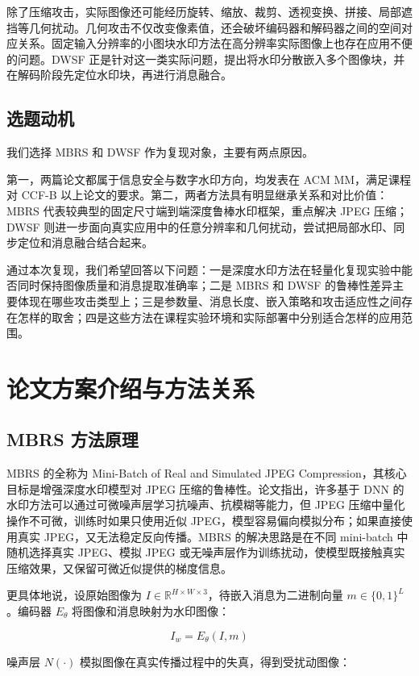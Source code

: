 ﻿\documentclass[UTF8,zihao=5]{ctexart}
\begin{document}
除了压缩攻击，实际图像还可能经历旋转、缩放、裁剪、透视变换、拼接、局部遮挡等几何扰动。几何攻击不仅改变像素值，还会破坏编码器和解码器之间的空间对应关系。固定输入分辨率的小图块水印方法在高分辨率实际图像上也存在应用不便的问题。DWSF 正是针对这一类实际问题，提出将水印分散嵌入多个图像块，并在解码阶段先定位水印块，再进行消息融合。

\subsection{选题动机}

我们选择 MBRS 和 DWSF 作为复现对象，主要有两点原因。

第一，两篇论文都属于信息安全与数字水印方向，均发表在 ACM MM，满足课程对 CCF-B 以上论文的要求。第二，两者方法具有明显继承关系和对比价值：MBRS 代表较典型的固定尺寸端到端深度鲁棒水印框架，重点解决 JPEG 压缩；DWSF 则进一步面向真实应用中的任意分辨率和几何扰动，尝试把局部水印、同步定位和消息融合结合起来。

通过本次复现，我们希望回答以下问题：一是深度水印方法在轻量化复现实验中能否同时保持图像质量和消息提取准确率；二是 MBRS 和 DWSF 的鲁棒性差异主要体现在哪些攻击类型上；三是参数量、消息长度、嵌入策略和攻击适应性之间存在怎样的取舍；四是这些方法在课程实验环境和实际部署中分别适合怎样的应用范围。


\section{论文方案介绍与方法关系}

\subsection{MBRS 方法原理}

MBRS 的全称为 Mini-Batch of Real and Simulated JPEG Compression，其核心目标是增强深度水印模型对 JPEG 压缩的鲁棒性。论文指出，许多基于 DNN 的水印方法可以通过可微噪声层学习抗噪声、抗模糊等能力，但 JPEG 压缩中量化操作不可微，训练时如果只使用近似 JPEG，模型容易偏向模拟分布；如果直接使用真实 JPEG，又无法稳定反向传播。MBRS 的解决思路是在不同 mini-batch 中随机选择真实 JPEG、模拟 JPEG 或无噪声层作为训练扰动，使模型既接触真实压缩效果，又保留可微近似提供的梯度信息。

更具体地说，设原始图像为 \(I \in \mathbb{R}^{H \times W \times 3}\)，待嵌入消息为二进制向量 \(m \in \{0,1\}^{L}\)。编码器 \(E_{\theta}\) 将图像和消息映射为水印图像：

\[
I_w = E_{\theta}(I, m)
\]

噪声层 \(N(\cdot)\) 模拟图像在真实传播过程中的失真，得到受扰动图像：
\end{document}
